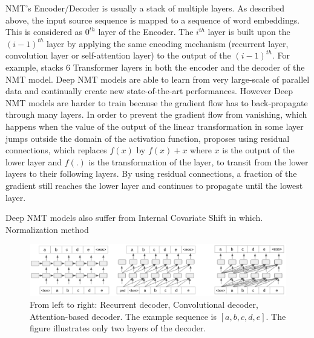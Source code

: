 NMT's Encoder/Decoder is usually a stack of multiple layers. As described above, the input source sequence is mapped to a sequence of word embeddings. This is considered as $0^{th}$ layer of the Encoder. The $i^{th}$ layer is built upon the $(i-1)^{th}$ layer by applying the same encoding mechanism (recurrent layer, convolution layer or self-attention layer) to the output of the $(i-1)^{th}$. For example, \cite{Vaswani17attention} stacks 6 Transformer layers in both the encoder and the decoder of the NMT model. Deep NMT models are able to learn from very large-scale of parallel data \cite{Ott18scaling} and continually create new state-of-the-art performances. However Deep NMT models are harder to train because the gradient flow has to back-propagate through many layers. In order to prevent the gradient flow from vanishing, which happens when the value of the output of the linear transformation in some layer jumps outside the domain of the activation function, \citep{He16deep} proposes using residual connections, which replaces $f(x)$ by $f(x)+x$ where $x$ is the output of the lower layer and $f(.)$ is the transformation of the layer, to transit from the lower layers to their following layers. By using residual connections, a fraction of the gradient still reaches the lower layer and continues to propagate until the lowest layer.

Deep NMT models also suffer from Internal Covariate Shift in which. Normalization method \citep{Ioffe15batch,Jimmy16layer}

\begin{figure}[htbp]
\includegraphics[width=\textwidth]{graphics/multi_layer_decoder.png}
\caption[Illustration of 3 most popular multi-layer auto-regressive decoding paradigms]{From left to right: Recurrent decoder, Convolutional decoder, Attention-based decoder. The example sequence is $[a,b,c,d,e]$. The figure illustrates only two layers of the decoder.}
\label{fig:decoding}
\end{figure}

